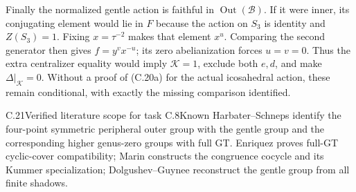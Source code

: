 Finally the normalized gentle action is faithful
in \(\operatorname{Out}(\mathcal B)\). If it were
inner, its conjugating element would lie in \(F\)
because the action on \(S_3\) is identity and
\(Z(S_3)=1\). Fixing \(x=\tau^{-2}\) makes that
element \(x^u\). Comparing the second generator
then gives \(f=y^v x^{-u}\); its zero abelianization
forces \(u=v=0\).
Thus the extra centralizer equality would imply
\(\mathcal K=1\), exclude both \(e,d\), and make
\(\Delta|_{\mathcal K}=0\). Without a proof of
(C.20a) for the actual icosahedral action, these
remain conditional, with exactly the missing
comparison identified.

\begin{statement}{C.21}{Verified literature scope for task C.8}{Known}
Harbater--Schneps identify the
four-point symmetric peripheral
outer group with the gentle group
and the corresponding higher
genus-zero groups with full GT.
Enriquez proves full-GT cyclic-cover
compatibility; Marin constructs
the congruence cocycle and its
Kummer specialization;
Dolgushev--Guynee reconstruct the
gentle group from all finite
shadows.
\end{statement}

